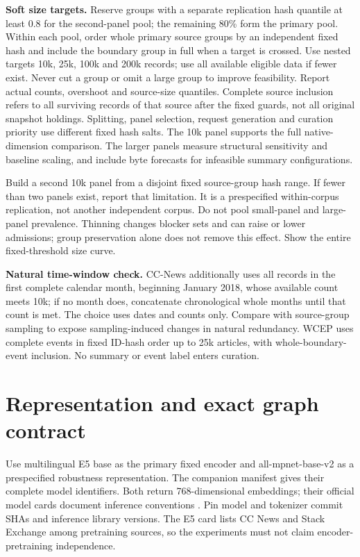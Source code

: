 \documentclass[11pt,a4paper]{article}
\begin{document}
\textbf{Soft size targets.} Reserve groups with a separate replication hash quantile at least 0.8 for the second-panel pool; the remaining 80\% form the primary pool. Within each pool, order whole primary source groups by an independent fixed hash and include the boundary group in full when a target is crossed. Use nested targets 10k, 25k, 100k and 200k records; use all available eligible data if fewer exist. Never cut a group or omit a large group to improve feasibility. Report actual counts, overshoot and source-size quantiles. Complete source inclusion refers to all surviving records of that source after the fixed guards, not all original snapshot holdings. Splitting, panel selection, request generation and curation priority use different fixed hash salts. The 10k panel supports the full native-dimension comparison. The larger panels measure structural sensitivity and baseline scaling, and include byte forecasts for infeasible summary configurations.

Build a second 10k panel from a disjoint fixed source-group hash range. If fewer than two panels exist, report that limitation. It is a prespecified within-corpus replication, not another independent corpus. Do not pool small-panel and large-panel prevalence. Thinning changes blocker sets and can raise or lower admissions; group preservation alone does not remove this effect. Show the entire fixed-threshold size curve.

\textbf{Natural time-window check.} CC-News additionally uses all records in the first complete calendar month, beginning January 2018, whose available count meets 10k; if no month does, concatenate chronological whole months until that count is met. The choice uses dates and counts only. Compare with source-group sampling to expose sampling-induced changes in natural redundancy. WCEP uses complete events in fixed ID-hash order up to 25k articles, with whole-boundary-event inclusion. No summary or event label enters curation.

\section{Representation and exact graph contract}
Use multilingual E5 base as the primary fixed encoder and all-mpnet-base-v2 as a prespecified robustness representation. The companion manifest gives their complete model identifiers. Both return 768-dimensional embeddings; their official model cards document inference conventions \cite{e5,mpnet}. Pin model and tokenizer commit SHAs and inference library versions. The E5 card lists CC News and Stack Exchange among pretraining sources, so the experiments must not claim encoder-pretraining independence.
\end{document}

